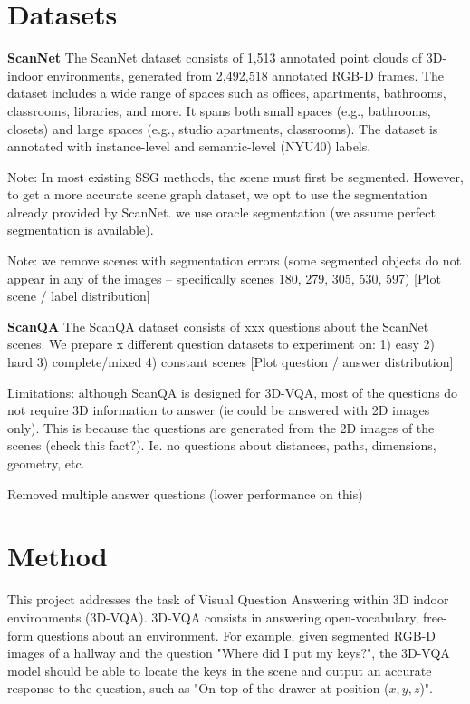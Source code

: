 \newpage
\chapter{Datasets}
\textbf{ScanNet}
The ScanNet dataset consists of 1,513 annotated point clouds of 3D-indoor environments, generated from 2,492,518 annotated RGB-D frames. The dataset includes a wide range of spaces such as offices, apartments, bathrooms, classrooms, libraries, and more. It spans both small spaces (e.g., bathrooms, closets) and large spaces (e.g., studio apartments, classrooms). The dataset is annotated with instance-level and semantic-level (NYU40) labels.

Note: In most existing SSG methods, the scene must first be segmented. However, to get a more accurate scene graph dataset, we opt to use the segmentation already provided by ScanNet. we use oracle segmentation (we assume perfect segmentation is available).

Note: we remove scenes with segmentation errors (some segmented objects do not appear in any of the images -- specifically scenes 180, 279, 305, 530, 597)
[Plot scene / label distribution]

\noindent
\textbf{ScanQA}
The ScanQA dataset consists of xxx questions about the ScanNet scenes.
We prepare x different question datasets to experiment on: 1) easy 2) hard 3) complete/mixed 4) constant scenes
[Plot question / answer distribution]

Limitations: although ScanQA is designed for 3D-VQA, most of the questions do not require 3D information to answer (ie could be answered with 2D images only). This is because the questions are generated from the 2D images of the scenes (check this fact?). Ie. no questions about distances, paths, dimensions, geometry, etc.

Removed multiple answer questions (lower performance on this)

\newpage
\chapter{Method}

This project addresses the task of Visual Question Answering within 3D indoor environments (3D-VQA). 3D-VQA consists in answering open-vocabulary, free-form questions about an environment. For example, given segmented RGB-D images of a hallway and the question "Where did I put my keys?", the 3D-VQA model should be able to locate the keys in the scene and output an accurate response to the question, such as "On top of the drawer at position ($x, y, z$)".

